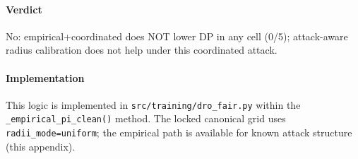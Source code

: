 \paragraph{Verdict}
No: empirical+coordinated does NOT lower DP in any cell (0/5); attack-aware radius calibration does not help under this coordinated attack.

\paragraph{Implementation}
This logic is implemented in \texttt{src/training/dro\_fair.py} within the \texttt{\_empirical\_pi\_clean()} method. The locked canonical grid uses \texttt{radii\_mode=uniform}; the empirical path is available for known attack structure (this appendix).
